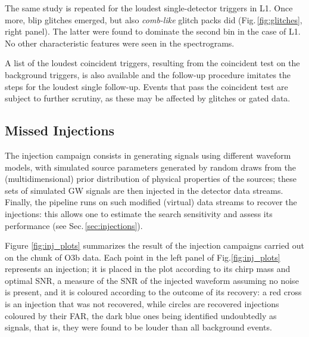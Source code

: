 \documentclass[binding=0.6cm, LaM]{sapthesis}
\begin{document}
	The same study is repeated for the loudest single-detector triggers in L1.
	Once more, blip glitches emerged, but also {\it comb-like} glitch packs did (Fig.\,\ref{fig:glitches}, right panel).
        The latter were found to dominate the second bin in the case of L1.
	No other characteristic features were seen in the spectrograms.
	
	A list of the loudest coincident triggers, resulting from the coincident test on the background triggers, 	
	is also available and the follow-up procedure imitates the steps for the loudest single follow-up.
	Events that pass the coincident test are subject to further scrutiny, 
	as these may be affected by glitches or gated data.

\subsection{Missed Injections}
 	The injection campaign consists in generating signals using different waveform models,
        with simulated source parameters generated by random draws from the (multidimensional) prior distribution of physical properties of the sources;
        these sets of simulated GW signals are then injected in the detector data streams.
        Finally, the pipeline runs on such modified (virtual) data streams to recover the injections: 
	this allows one to estimate the search sensitivity and assess its performance (see Sec.\,\ref{sec:injections}).

        Figure \ref{fig:inj_plots} summarizes the result of the injection campaigns carried out on the chunk of O3b data.
        Each point in the left panel of Fig.\ref{fig:inj_plots} represents an injection;
        it is placed in the plot according to its chirp mass and optimal SNR,
        a measure of the SNR of the injected waveform assuming no noise is present,
        and it is coloured according to the outcome of its recovery:
        a red cross is an injection that was not recovered,
        while circles are recovered injections coloured by their FAR,
        the dark blue ones being identified undoubtedly as signals, that is,
        they were found to be louder than all background events.
\end{document}
